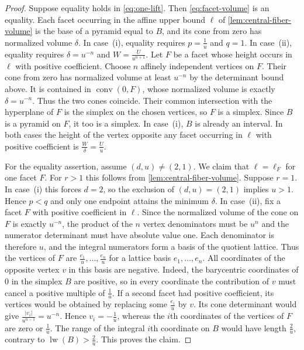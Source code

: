 \documentclass[reqno, 11pt]{article}
\numberwithin{equation}{section}
\theoremstyle{definition}
\DeclareMathOperator{\conv}{conv}
\DeclareMathOperator{\lw}{lw}
\begin{document}
\begin{proof}
Suppose equality holds in \eqref{eq:one-lift}. Then
\eqref{eq:facet-volume} is an equality. Each facet occurring in the
affine upper bound $\ell$ of \cref{lem:central-fiber-volume} is the
base of a pyramid equal to $B$, and its cone from zero has normalized
volume $\delta$. In case~(i), equality requires $p=\frac{1}{u}$ and $q=1$.
In case~(ii), equality requires $\delta=u^{-n}$ and
$W=\frac{U}{u^{n+1}}$. Let $F$ be a facet whose height occurs in
$\ell$ with positive coefficient. Choose $n$ affinely independent
vertices on $F$. Their cone from zero has normalized volume at
least $u^{-n}$ by the determinant bound above. It is contained in
$\conv(0,F)$, whose normalized volume is exactly $\delta=u^{-n}$.
Thus the two cones coincide. Their common intersection with the
hyperplane of $F$ is the simplex on the chosen vertices, so $F$
is a simplex. Since $B$ is a pyramid on $F$, it too is a simplex.
In case~(i), $B$ is already an interval. In both cases the height
of the vertex opposite any facet occurring in $\ell$ with positive
coefficient is $\frac{W}{\delta}=\frac{U}{u}$.

For the equality assertion, assume $(d,u)\ne(2,1)$. We claim that
$\ell=\ell_F$ for one facet $F$. For $r>1$ this follows
from \cref{lem:central-fiber-volume}. Suppose $r=1$. In case~(i) this forces $d=2$, so the exclusion
of $(d,u)=(2,1)$ implies $u>1$.
Hence $p<q$ and only one endpoint attains the minimum $\delta$.
In case~(ii), fix a facet $F$ with positive coefficient in $\ell$.
Since the normalized volume of the cone on $F$ is exactly $u^{-n}$,
the product of the $n$ vertex denominators must be $u^n$
and the numerator determinant must have absolute value one. Each
denominator is therefore $u$, and the integral numerators form a
basis of the quotient lattice. Thus the vertices of $F$ are
$\frac{e_1}{u},\ldots,\frac{e_n}{u}$ for a lattice basis $e_1,\ldots,e_n$. All
coordinates of the opposite vertex $v$ in this basis are negative.
Indeed, the barycentric coordinates of $0$ in the simplex $B$ are
positive, so in every coordinate the contribution of $v$ must
cancel a positive multiple of $\frac{1}{u}$.
If a second facet had positive coefficient, its vertices would be
obtained by replacing some $\frac{e_i}{u}$ by $v$. Its cone determinant
would give $\frac{|v_i|}{u^{n-1}}=u^{-n}$. Hence $v_i=-\frac{1}{u}$, whereas the $i$th coordinates of the
vertices of $F$ are zero or $\frac{1}{u}$. The range of the integral
$i$th coordinate on $B$ would have length $\frac{2}{u}$, contrary to $\lw(B)>\frac{2}{u}$.
This proves the claim.


\end{proof}
\end{document}
